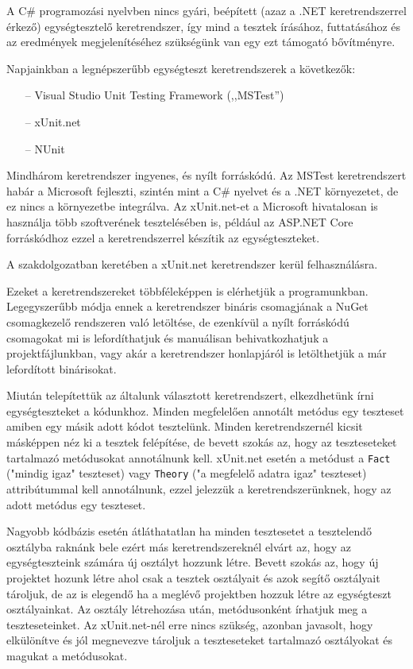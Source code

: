 
A C\# programozási nyelvben nincs gyári, beépített (azaz a .NET keretrendszerrel érkező) egységtesztelő keretrendszer, így mind a tesztek írásához, futtatásához és az eredmények megjelenítéséhez szükségünk van egy ezt támogató bővítményre.

Napjainkban a legnépszerűbb egységteszt keretrendszerek a következők:
\begin{itemize}
    \item[--] Visual Studio Unit Testing Framework (,,MSTest'')
    \item[--] xUnit.net
    \item[--] NUnit
\end{itemize}

Mindhárom keretrendszer ingyenes, és nyílt forráskódú. Az MSTest keretrendszert habár a Microsoft fejleszti, szintén mint a C\# nyelvet és a .NET környezetet, de ez nincs a környezetbe integrálva. Az xUnit.net-et a Microsoft hivatalosan is használja több szoftverének tesztelésében is, például az ASP.NET Core forráskódhoz ezzel a keretrendszerrel készítik az egységteszteket.

A szakdolgozatban keretében a xUnit.net keretrendszer kerül felhasználásra.

Ezeket a keretrendszereket többféleképpen is elérhetjük a programunkban.
Legegyszerűbb módja ennek a keretrendszer bináris csomagjának a NuGet csomagkezelő rendszeren való letöltése, de ezenkívül a nyílt forráskódú csomagokat mi is lefordíthatjuk és manuálisan behivatkozhatjuk a projektfájlunkban, vagy akár a keretrendszer honlapjáról is letölthetjük a már lefordított binárisokat.

Miután telepítettük az általunk választott keretrendszert, elkezdhetünk írni egységteszteket a kódunkhoz. Minden megfelelően annotált metódus egy teszteset amiben egy másik adott kódot tesztelünk. Minden keretrendszernél kicsit másképpen néz ki a tesztek felépítése, de bevett szokás az, hogy az teszteseteket tartalmazó metódusokat annotálnunk kell. xUnit.net esetén a metódust a \texttt{Fact} ("mindig igaz" teszteset) vagy \texttt{Theory} ("a megfelelő adatra igaz" teszteset) attribútummal kell annotálnunk, ezzel jelezzük a keretrendszerünknek, hogy az adott metódus egy teszteset.

Nagyobb kódbázis esetén átláthatatlan ha minden tesztesetet a tesztelendő osztályba raknánk bele ezért más keretrendszereknél elvárt az, hogy az egységteszteink számára új osztályt hozzunk létre. Bevett szokás az, hogy új projektet hozunk létre ahol csak a tesztek osztályait és azok segítő osztályait tároljuk, de az is elegendő ha a meglévő projektben hozzuk létre az egységteszt osztályainkat. Az osztály létrehozása után, metódusonként írhatjuk meg a teszteseteinket. Az xUnit.net-nél erre nincs szükség, azonban javasolt, hogy elkülönítve és jól megnevezve tároljuk a teszteseteket tartalmazó osztályokat és magukat a metódusokat.

